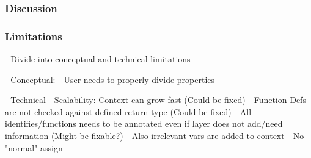 \subsubsection{Discussion}
\label{sssec:uc2_discussion}

\subsubsection{Limitations}
\label{sssec:uc2_limitations}
- Divide into conceptual and technical limitations

- Conceptual:
	- User needs to properly divide properties
	
- Technical
	- Scalability: Context can grow fast (Could be fixed)
	- Function Defs are not checked against defined return type (Could be fixed)
	- All identifies/functions needs to be annotated even if layer does not add/need information
	(Might be fixable?)
	- Also irrelevant vars are added to context
	- No "normal" assign
